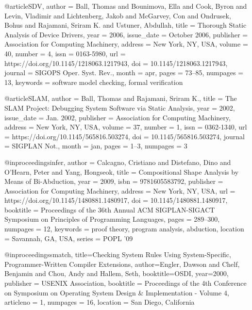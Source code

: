 @article{SDV, author = {Ball, Thomas and Bounimova, Ella and Cook, Byron and Levin, Vladimir and Lichtenberg, Jakob and McGarvey, Con and Ondrusek, Bohus and Rajamani, Sriram K. and Ustuner, Abdullah}, title = {Thorough Static Analysis of Device Drivers}, year = {2006}, issue_date = {October 2006}, publisher = {Association for Computing Machinery}, address = {New York, NY, USA}, volume = {40}, number = {4}, issn = {0163-5980}, url = {https://doi.org/10.1145/1218063.1217943}, doi = {10.1145/1218063.1217943}, journal = {SIGOPS Oper. Syst. Rev.}, month = apr, pages = {73–85}, numpages = {13}, keywords = {software model checking, formal verification} }
 
@article{SLAM, author = {Ball, Thomas and Rajamani, Sriram K.}, title = {The SLAM Project: Debugging System Software via Static Analysis}, year = {2002}, issue_date = {Jan. 2002}, publisher = {Association for Computing Machinery}, address = {New York, NY, USA}, volume = {37}, number = {1}, issn = {0362-1340}, url = {https://doi.org/10.1145/565816.503274}, doi = {10.1145/565816.503274}, journal = {SIGPLAN Not.}, month = jan, pages = {1–3}, numpages = {3} }

@inproceedings{infer, author = {Calcagno, Cristiano and Distefano, Dino and O’Hearn, Peter and Yang, Hongseok}, title = {Compositional Shape Analysis by Means of Bi-Abduction}, year = {2009}, isbn = {9781605583792}, publisher = {Association for Computing Machinery}, address = {New York, NY, USA}, url = {https://doi.org/10.1145/1480881.1480917}, doi = {10.1145/1480881.1480917}, booktitle = {Proceedings of the 36th Annual ACM SIGPLAN-SIGACT Symposium on Principles of Programming Languages}, pages = {289–300}, numpages = {12}, keywords = {proof theory, program analysis, abduction}, location = {Savannah, GA, USA}, series = {POPL ’09} }

@inproceedings{smatch,
  title={Checking System Rules Using System-Specific, Programmer-Written Compiler Extensions},
  author={Engler, Dawson and Chelf, Benjamin and Chou, Andy and Hallem, Seth},
  booktitle={OSDI},
  year={2000},
  publisher = {USENIX Association},
  booktitle = {Proceedings of the 4th Conference on Symposium on Operating System Design & Implementation - Volume 4},
  articleno = {1}, numpages = {16}, location = {San Diego, California}
}